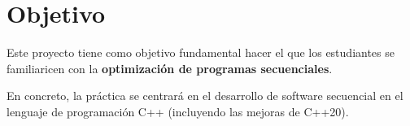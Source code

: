 \section{Objetivo}

Este proyecto tiene como objetivo fundamental hacer el que los
estudiantes se familiaricen con la \textbf{optimización de programas
secuenciales}.

En concreto, la práctica se centrará en el desarrollo de software
secuencial en el lenguaje de programación C++ (incluyendo las mejoras de
C++20).
